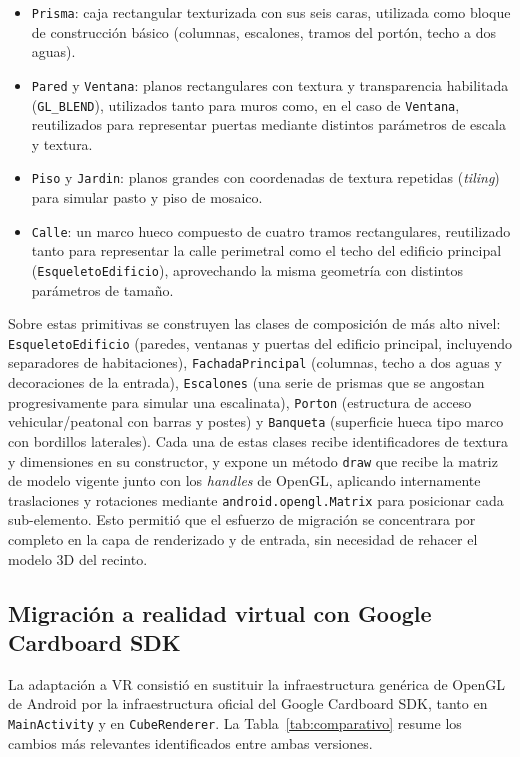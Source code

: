 \documentclass[conference]{IEEEtran}
\begin{document}
	\begin{itemize}
		\item \texttt{Prisma}: caja rectangular texturizada con sus seis caras, utilizada como bloque de construcción básico (columnas, escalones, tramos del portón, techo a dos aguas).
		\item \texttt{Pared} y \texttt{Ventana}: planos rectangulares con textura y transparencia habilitada (\texttt{GL\_BLEND}), utilizados tanto para muros como, en el caso de \texttt{Ventana}, reutilizados para representar puertas mediante distintos parámetros de escala y textura.
		\item \texttt{Piso} y \texttt{Jardin}: planos grandes con coordenadas de textura repetidas (\textit{tiling}) para simular pasto y piso de mosaico.
		\item \texttt{Calle}: un marco hueco compuesto de cuatro tramos rectangulares, reutilizado tanto para representar la calle perimetral como el techo del edificio principal (\texttt{EsqueletoEdificio}), aprovechando la misma geometría con distintos parámetros de tamaño.
	\end{itemize}
	
	Sobre estas primitivas se construyen las clases de composición de más alto nivel: \texttt{EsqueletoEdificio} (paredes, ventanas y puertas del edificio principal, incluyendo separadores de habitaciones), \texttt{FachadaPrincipal} (columnas, techo a dos aguas y decoraciones de la entrada), \texttt{Escalones} (una serie de prismas que se angostan progresivamente para simular una escalinata), \texttt{Porton} (estructura de acceso vehicular/peatonal con barras y postes) y \texttt{Banqueta} (superficie hueca tipo marco con bordillos laterales). Cada una de estas clases recibe identificadores de textura y dimensiones en su constructor, y expone un método \texttt{draw} que recibe la matriz de modelo vigente junto con los \textit{handles} de OpenGL, aplicando internamente traslaciones y rotaciones mediante \texttt{android.opengl.Matrix} para posicionar cada sub-elemento. Esto permitió que el esfuerzo de migración se concentrara por completo en la capa de renderizado y de entrada, sin necesidad de rehacer el modelo 3D del recinto.
	
	\subsection{Migración a realidad virtual con Google Cardboard SDK}
	La adaptación a VR consistió en sustituir la infraestructura genérica de OpenGL de Android por la infraestructura oficial del Google Cardboard SDK, tanto en \texttt{MainActivity} y en \texttt{CubeRenderer}. La Tabla~\ref{tab:comparativo} resume los cambios más relevantes identificados entre ambas versiones.
	
\end{document}
